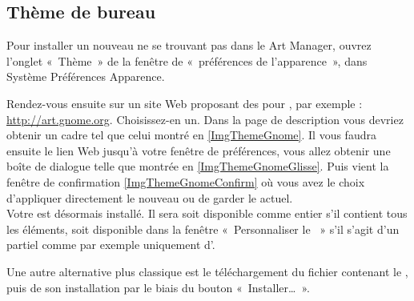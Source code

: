 \subsection{Thème de bureau}
Pour installer un nouveau  ne se trouvant pas dans le Art Manager, ouvrez l'onglet «~Thème~» de la fenêtre de «~préférences de l'apparence~», dans Système \FlecheDroite Préférences \FlecheDroite Apparence.\par
{}
\InstallationThemeGnome
Rendez-vous ensuite sur un site Web proposant des  pour , par exemple : \url{http://art.gnome.org}. Choisissez-en un. Dans la page de description vous devriez obtenir un cadre tel que celui montré en \ref{ImgThemeGnome}. Il vous faudra ensuite  le lien Web jusqu'à votre fenêtre de préférences, vous allez obtenir une boîte de dialogue telle que montrée en \ref{ImgThemeGnomeGlisse}. Puis vient la fenêtre de confirmation \ref{ImgThemeGnomeConfirm} où vous avez le choix d'appliquer directement le nouveau  ou de garder le  actuel.\\
Votre  est désormais installé. Il sera soit disponible comme  entier s'il contient tous les éléments, soit disponible dans la fenêtre «~Personnaliser le ~» s'il s'agit d'un  partiel comme par exemple uniquement d'.\par
Une autre alternative plus classique est le téléchargement du fichier contenant le , puis de son installation par le biais du bouton «~Installer\dots{}~».
